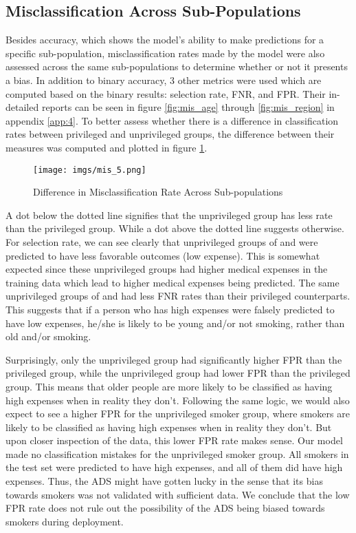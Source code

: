 \documentclass[10pt]{article}
\newcommand{\code}[1]{{\color{black}{\texttt{#1}}}} %
\begin{document}
\FloatBarrier
\subsection{Misclassification Across Sub-Populations}
Besides accuracy, which shows the model's ability to make predictions for a specific sub-population, misclassification rates made by the model were also assessed across the same sub-populations to determine whether or not it presents a bias. In addition to binary accuracy, 3 other metrics were used which are computed based on the binary results: selection rate, FNR, and FPR. Their in-detailed reports can be seen in figure \ref{fig:mis_age} through \ref{fig:mis_region} in appendix \ref{app:4}. To better assess whether there is a difference in classification rates between privileged and unprivileged groups, the difference between their measures was computed and plotted in figure \ref{fig:mis_5}. 

\begin{figure}[h!]
    \centering
    \texttt{[image: imgs/mis\_5.png]}
    \caption{Difference in Misclassification Rate Across Sub-populations}
    \label{fig:mis_5}
\end{figure}

A dot below the dotted line signifies that the unprivileged group has less rate than the privileged group. While a dot above the dotted line suggests otherwise. For selection rate, we can see clearly that unprivileged groups of \code{age} and \code{smoker} were predicted to have less favorable outcomes (low expense). This is somewhat expected since these unprivileged groups had higher medical expenses in the training data which lead to higher medical expenses being predicted. The same unprivileged groups of \code{age} and \code{smoker} had less FNR rates than their privileged counterparts. This suggests that if a person who has high expenses were falsely predicted to have low expenses, he/she is likely to be young and/or not smoking, rather than old and/or smoking. 

Surprisingly, only the unprivileged \code{age} group had significantly higher FPR than the privileged group, while the unprivileged  group had lower FPR than the privileged group. This means that older people are more likely to be classified as having high expenses when in reality they don't. Following the same logic, we would also expect to see a higher FPR for the unprivileged smoker group, where smokers are likely to be classified as having high expenses when in reality they don't. But upon closer inspection of the data, this lower FPR rate makes sense. Our model made no classification mistakes for the unprivileged smoker group. All smokers in the test set were predicted to have high expenses, and all of them did have high expenses. Thus, the ADS might have gotten lucky in the sense that its bias towards smokers was not validated with sufficient data. We conclude that the low FPR rate does not rule out the possibility of the ADS being biased towards smokers during deployment. 
\end{document}
